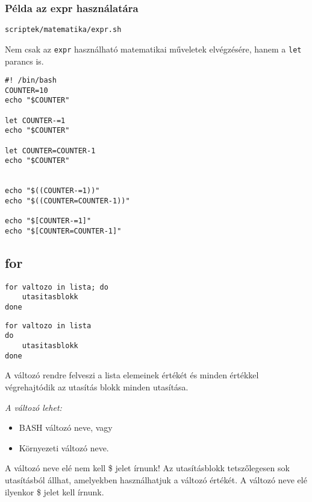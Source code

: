 \subsubsection*{Példa az expr használatára}
\texttt{scriptek/matematika/expr.sh}

Nem csak az \texttt{expr} használható matematikai műveletek elvégzésére, hanem a \texttt{let} parancs is.

\begin{lstlisting}[title=Példa let használatára (scriptek/matematika/let.sh)]
#! /bin/bash
COUNTER=10
echo "$COUNTER"

let COUNTER-=1
echo "$COUNTER"

let COUNTER=COUNTER-1
echo "$COUNTER"


echo "$((COUNTER-=1))"
echo "$((COUNTER=COUNTER-1))"

echo "$[COUNTER-=1]"
echo "$[COUNTER=COUNTER-1]"
\end{lstlisting}



\subsection{for}

\begin{minipage}{0.4\textwidth}
\lstset{linewidth=\textwidth}
\begin{lstlisting}
for valtozo in lista; do
	utasitasblokk
done
\end{lstlisting}
\end{minipage}
\hfill
\begin{minipage}{0.4\textwidth}\lstset{linewidth=\textwidth}
\begin{lstlisting}
for valtozo in lista
do
	utasitasblokk
done
\end{lstlisting}
\end{minipage}


A változó rendre felveszi a lista elemeinek értékét és minden értékkel végrehajtódik az
utasítás blokk minden utasítása.\smallskip

\emph{A változó lehet:}
\begin{itemize}
\item BASH változó neve, vagy
\item Környezeti változó neve.
\end{itemize}

A változó neve elé nem kell \$ jelet írnunk!  Az utasításblokk tetszőlegesen sok utasításból állhat, 
amelyekben használhatjuk a változó értékét. A változó neve elé ilyenkor \$ jelet kell írnunk.
\smallskip

